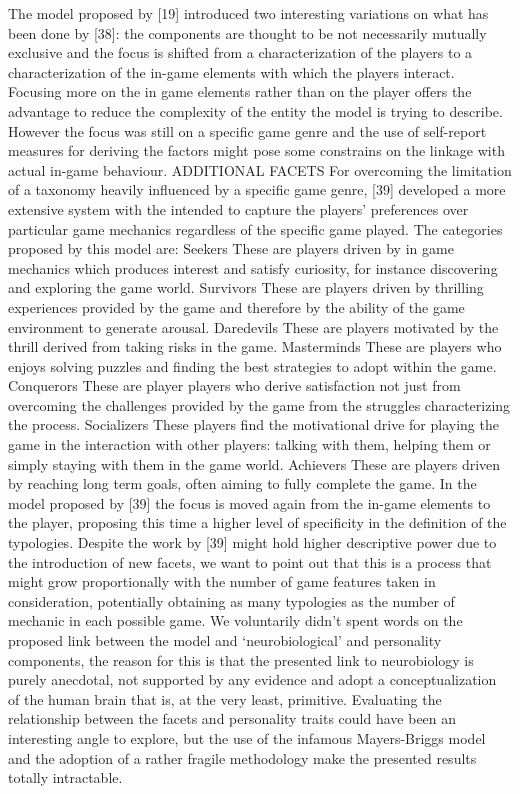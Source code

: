The model proposed by [19] introduced two interesting variations on what has been done by [38]: the components are thought to be not necessarily mutually exclusive and the focus is shifted from a characterization of the players to a characterization of the in-game elements with which the players interact. Focusing more on the in game elements rather than on the player offers the advantage to reduce the complexity of the entity the model is trying to describe. However the focus was still on a specific game genre and the use of self-report measures for deriving the factors might pose some constrains on the linkage with actual in-game behaviour.
ADDITIONAL FACETS
For overcoming the limitation of a taxonomy heavily influenced by a specific game genre, [39] developed a more extensive system with the intended to capture the players’ preferences over particular game mechanics regardless of the specific game played. The categories proposed by this model are:
Seekers 
These are players driven by in game mechanics which produces interest and satisfy curiosity, for instance discovering and exploring the game world.
Survivors
These are players driven by thrilling experiences provided by the game and therefore by the ability of the game environment to generate arousal.
Daredevils 
These are players motivated by the thrill derived from taking risks in the game.
Masterminds 
These are players who enjoys solving puzzles and finding the best strategies to adopt within the game.
Conquerors
These are player players who derive satisfaction not just from overcoming the challenges provided by the game from the struggles characterizing the process.
Socializers 
These players find the motivational drive for playing the game in the interaction with other players: talking with them, helping them or simply staying with them in the game world. 
Achievers 
These are players driven by reaching long term goals, often aiming to fully complete the game.
In the model proposed by [39] the focus is moved again from the in-game elements to the player, proposing this time a higher level of specificity in the definition of the typologies. Despite the work by [39] might hold higher descriptive power due to the introduction of new facets, we want to point out that this is a process that might grow proportionally with the number of game features taken in consideration, potentially obtaining as many typologies as the number of mechanic in each possible game. We voluntarily didn’t spent words on the proposed link between the model and ‘neurobiological’ and personality components, the reason for this is that the presented link to neurobiology is purely anecdotal, not supported by any evidence and adopt  a conceptualization of the human brain that is, at the very least, primitive. Evaluating the relationship between the facets and personality traits could have been an interesting angle to explore, but the use of the infamous Mayers-Briggs model and the adoption of a rather fragile methodology make the presented results totally intractable.
